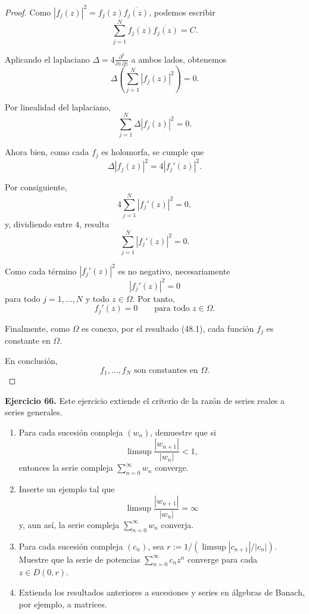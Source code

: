 \documentclass[11pt,a4paper]{article}
\theoremstyle{definition}
\theoremstyle{plain}
\theoremstyle{remark}
\begin{document}
\begin{enumerate}
\begin{proof}
			Como $|f_j(z)|^2=f_j(z)\overline{f_j(z)}$, podemos escribir
			\[
			\sum_{j=1}^{N}f_j(z)\overline{f_j(z)}=C.
			\]
			
			Aplicando el laplaciano $\Delta=4\frac{\partial^2}
			{\partial z\,\partial\overline{z}}$ a ambos lados, obtenemos
			\[
			\Delta\left(\sum_{j=1}^{N}|f_j(z)|^2\right)=0.
			\]
			
			Por linealidad del laplaciano,
			\[
			\sum_{j=1}^{N}\Delta |f_j(z)|^2=0.
			\]
			
			Ahora bien, como cada $f_j$ es holomorfa, se cumple que
			\[
			\Delta |f_j(z)|^2=4|f_j'(z)|^2.
			\]
			
			Por consiguiente,
			\[
			4\sum_{j=1}^{N}|f_j'(z)|^2=0,
			\]
			y, dividiendo entre $4$, resulta
			\[
			\sum_{j=1}^{N}|f_j'(z)|^2=0.
			\]
			
			Como cada término $|f_j'(z)|^2$ es no negativo, necesariamente
			\[
			|f_j'(z)|^2=0
			\]
			para todo $j=1,\ldots,N$ y todo $z\in\Omega$. Por tanto,
			\[
			f_j'(z)=0
			\qquad \text{para todo }z\in\Omega.
			\]
			
			Finalmente, como $\Omega$ es conexo, por el resultado (48.1),
			cada función $f_j$ es constante en $\Omega$.
			
			En conclusión,
			\[
			\boxed{f_1,\ldots,f_N\text{ son constantes en }\Omega.}
			\]
		\end{proof}
		
		
	\end{enumerate}
	\noindent
	\textbf{Ejercicio 66.} Este ejercicio extiende el criterio de la razón de series reales a series generales.
	
	\vspace{1em}
	
	\begin{enumerate}[label=\textbf{(66.\arabic*)}, leftmargin=*]
		\item Para cada sucesión compleja $(w_n)$, demuestre que si 
		\[
		\limsup \frac{|w_{n+1}|}{|w_n|} < 1,
		\]
		entonces la serie compleja $\sum_{n=0}^{\infty} w_n$ converge.
		
		\item Inserte un ejemplo tal que 
		\[
		\limsup \frac{|w_{n+1}|}{|w_n|} = \infty
		\]
		y, aun así, la serie compleja $\sum_{n=0}^{\infty} w_n$ converja.
		
		\item Para cada sucesión compleja $(c_n)$, sea $r := 1 / (\limsup |c_{n+1}|/|c_n|)$. Muestre que la serie de potencias $\sum_{n=0}^{\infty} c_n z^n$ converge para cada $z \in D(0, r)$.
		
		\item[\textbf{$\dagger$ (66.4)}] Extienda los resultados anteriores a sucesiones y series en álgebras de Banach, por ejemplo, a matrices.
	\end{enumerate}
	
\end{document}
